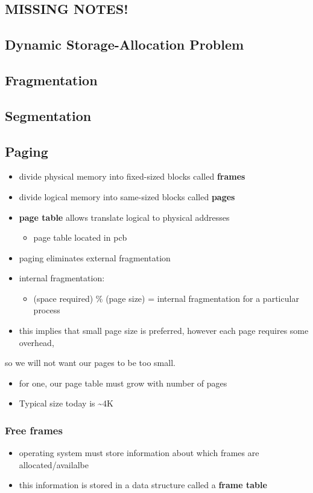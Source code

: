 \documentclass[11pt]{article}
\begin{document}
\subsection{MISSING NOTES!}
\label{sec:org2a9933f}
\subsection{Dynamic Storage-Allocation Problem}
\label{sec:org37b5947}
\subsection{Fragmentation}
\label{sec:org7ba4d58}
\subsection{Segmentation}
\label{sec:orgd553114}
\subsection{Paging}
\label{sec:orgdd37d4e}
\begin{itemize}
\item divide physical memory into fixed-sized blocks called \textbf{frames}
\item divide logical memory into same-sized blocks called \textbf{pages}
\item \textbf{page table} allows translate logical to physical addresses
\begin{itemize}
\item page table located in pcb
\end{itemize}
\item paging eliminates external fragmentation
\item internal fragmentation:
\begin{itemize}
\item (space required) \% (page size) = internal fragmentation for a particular process
\end{itemize}
\item this implies that small page size is preferred, however each page requires some overhead,
\end{itemize}
so we will not want our pages to be too small.
\begin{itemize}
\item for one, our page table must grow with number of pages
\item Typical size today is \textasciitilde{}4K
\end{itemize}
\subsubsection{Free frames}
\label{sec:org5bf6c7b}
\begin{itemize}
\item operating system must store information about which frames are allocated/availalbe
\item this information is stored in a data structure called a \textbf{frame table}
\end{itemize}
\end{document}
